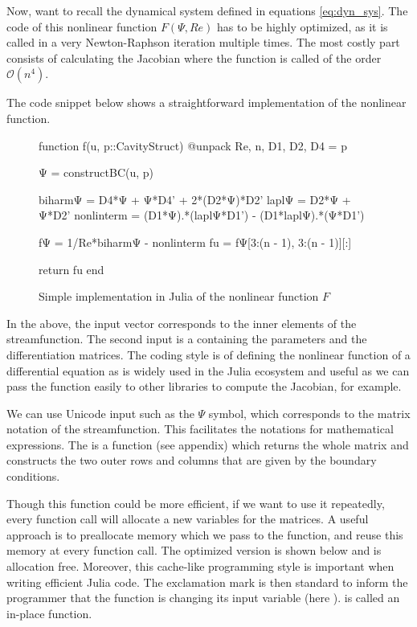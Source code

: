Now, want to recall the dynamical system defined in equations \eqref{eq:dyn_sys}.
The code of this nonlinear function $F(\Psi, Re)$ has to be highly optimized,
as it is called in a very Newton-Raphson iteration multiple times. The most
costly part consists of calculating the Jacobian where the function is called
of the order $\mathcal{O}(n^4)$.

The code snippet below shows a straightforward implementation of the
nonlinear function. 


\begin{figure}[ht]
\begin{jllisting}
function f(u, p::CavityStruct)
    @unpack Re, n, D1, D2, D4 = p

    Ψ = constructBC(u, p)

    biharmΨ = D4*Ψ +  Ψ*D4' + 2*(D2*Ψ)*D2'
    laplΨ = D2*Ψ + Ψ*D2'
    nonlinterm = (D1*Ψ).*(laplΨ*D1') - (D1*laplΨ).*(Ψ*D1')
    
    fΨ = 1/Re*biharmΨ - nonlinterm
    fu = fΨ[3:(n - 1), 3:(n - 1)][:]

    return fu 
end
\end{jllisting}
\caption{Simple implementation in Julia of the nonlinear function $F$}
\end{figure}

In the above, the input vector  corresponds to the inner elements of
the streamfunction. The second input  is a 
containing the parameters and the differentiation matrices. The coding style is
of defining the nonlinear function of a differential equation as 
is widely used in the Julia ecosystem and useful as we can pass the function
easily to other libraries to compute the Jacobian, for example.

We can use Unicode input such as the $\Psi $ symbol, which corresponds to the
matrix notation of the streamfunction. This facilitates the notations for
mathematical expressions. The  is a function (see
appendix) which returns the whole matrix and constructs the two outer rows and
columns that are given by the boundary conditions.

Though this function could be more efficient, if we want to use it repeatedly,
every function call will allocate a new variables for the matrices. A useful
approach is to preallocate memory which we pass to the function, and reuse this
memory at every function call. The optimized version is shown below and is
allocation free. Moreover, this cache-like programming style is important when
writing efficient Julia code. The exclamation mark is then standard to inform
the programmer that the function is changing its input variable (here
).  is called an in-place function.


